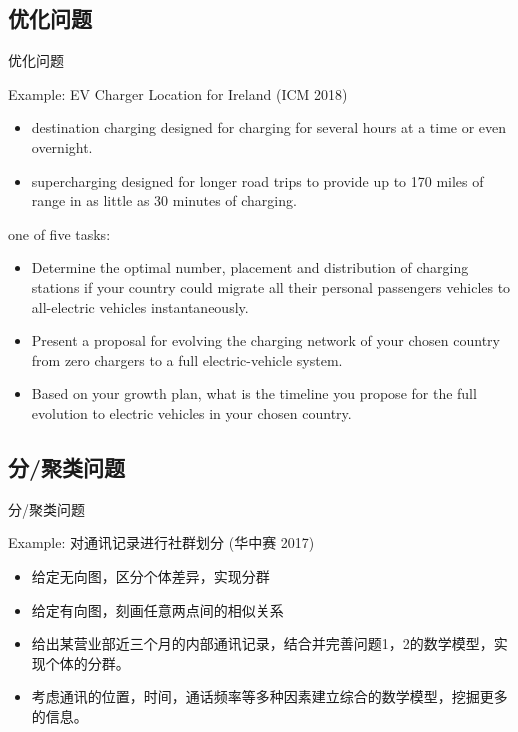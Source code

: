 \documentclass[aspectratio=43]{beamer}
\begin{document}
\subsection{优化问题}
\begin{frame}{优化问题}
\begin{block}{Example: EV Charger Location for Ireland (ICM 2018)}
\end{block}
\begin{itemize}
  \item destination charging designed for charging for several hours at a time or even overnight.
  \item supercharging designed for longer road trips to provide up to 170 miles of range in as little as 30 minutes of charging.
\end{itemize}
one of five tasks:
\begin{itemize}
  \item Determine the optimal number, placement and distribution of charging stations if your country could migrate all their personal passengers vehicles to all-electric vehicles instantaneously.
  \item Present a proposal for evolving the charging network of your chosen country from zero chargers to a full electric-vehicle system.
  \item Based on your growth plan, what is the timeline you propose for the full evolution to electric vehicles in your chosen country.
\end{itemize}
\end{frame}

\subsection{分/聚类问题}
\begin{frame}{分/聚类问题}
\begin{block}{Example: 对通讯记录进行社群划分 (华中赛 2017)}
\end{block}
\vspace{1cm}
\begin{itemize}
  \item 给定无向图，区分个体差异，实现分群
  \item 给定有向图，刻画任意两点间的相似关系
  \item 给出某营业部近三个月的内部通讯记录，结合并完善问题1，2的数学模型，实现个体的分群。
  \item 考虑通讯的位置，时间，通话频率等多种因素建立综合的数学模型，挖掘更多的信息。
\end{itemize}
\vspace{1cm}
\end{frame}
\end{document}
